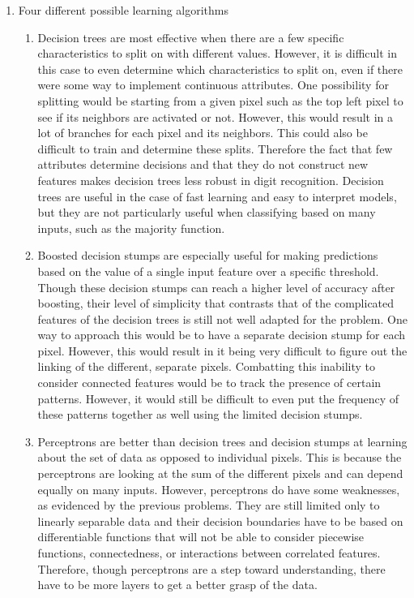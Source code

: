 \documentclass[11pt]{article}
\begin{document}
\begin{enumerate}
\begin{enumerate}
	\end{enumerate}
\item Four different possible learning algorithms
	\begin{enumerate}
	\item Decision trees are most effective when there are a few specific characteristics to split on with different values. However, it is difficult in this case to even determine which characteristics to split on, even if there were some way to implement continuous attributes. One possibility for splitting would be starting from a given pixel such as the top left pixel to see if its neighbors are activated or not. However, this would result in a lot of branches for each pixel and its neighbors. This could also be difficult to train and determine these splits. Therefore the fact that few attributes determine decisions and that they do not construct new features makes decision trees less robust in digit recognition. Decision trees are useful in the case of fast learning and easy to interpret models, but they are not particularly useful when classifying based on many inputs, such as the majority function.
	\item Boosted decision stumps are especially useful for making predictions based on the value of a single input feature over a specific threshold. Though these decision stumps can reach a higher level of accuracy after boosting, their level of simplicity that contrasts that of the complicated features of the decision trees is still not well adapted for the problem. One way to approach this would be to have a separate decision stump for each pixel. However, this would result in it being very difficult to figure out the linking of the different, separate pixels. Combatting this inability to consider connected features would be to track the presence of certain patterns. However, it would still be difficult to even put the frequency of these patterns together as well using the limited decision stumps.
	\item Perceptrons are better than decision trees and decision stumps at learning about the set of data as opposed to individual pixels. This is because the perceptrons are looking at the sum of the different pixels and can depend equally on many inputs. However, perceptrons do have some weaknesses, as evidenced by the previous problems. They are still limited only to linearly separable data and their decision boundaries have to be based on differentiable functions that will not be able to consider piecewise functions, connectedness, or interactions between correlated features. Therefore, though perceptrons are a step toward understanding, there have to be more layers to get a better grasp of the data. 

\end{enumerate}
\end{enumerate}
\end{document}

